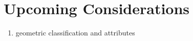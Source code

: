 \documentclass{article}
\begin{document}
\section{Upcoming Considerations}

\begin{enumerate}
\item geometric classification and attributes
\end{enumerate}
\end{document}
